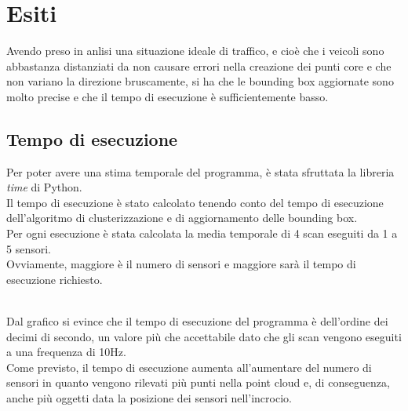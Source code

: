 \documentclass[italian]{report}
\begin{document}
\newpage
\chapter{Esiti}
Avendo preso in anlisi una situazione ideale di traffico, e cioè che i veicoli sono abbastanza distanziati da non causare errori nella creazione dei punti core e che non variano la direzione bruscamente, si ha che le bounding box aggiornate sono molto precise e che il tempo di esecuzione è sufficientemente basso.\\
\section{Tempo di esecuzione}
Per poter avere una stima temporale del programma, è stata sfruttata la libreria \textit{time} di Python.\\
Il tempo di esecuzione è stato calcolato tenendo conto del tempo di esecuzione dell'algoritmo di clusterizzazione e di aggiornamento delle bounding box.\\
Per ogni esecuzione è stata calcolata la media temporale di 4 scan eseguiti da 1 a 5 sensori.\\
Ovviamente, maggiore è il numero di sensori e maggiore sarà il tempo di esecuzione richiesto.\\
\\
Dal grafico si evince che il tempo di esecuzione del programma è dell'ordine dei decimi di secondo, un valore più che accettabile dato che gli scan vengono eseguiti a una frequenza di 10Hz.\\
Come previsto, il tempo di esecuzione aumenta all'aumentare del numero di sensori in quanto vengono rilevati più punti nella point cloud e, di conseguenza, anche più oggetti data la posizione dei sensori nell'incrocio.\\
\end{document}
